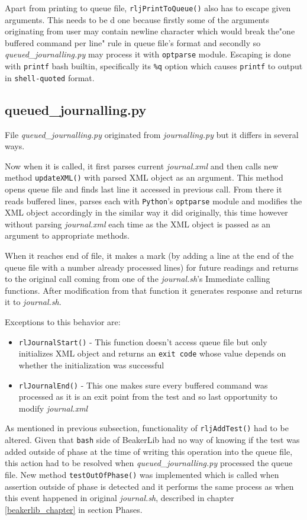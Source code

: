Apart from printing to queue file, \texttt{rljPrintToQueue()} also has to escape given arguments. This needs to be d
one because firstly some of the arguments originating from user may contain newline character which would break the"one buffered command per line" rule in  queue file's format and secondly so \textit{queued\_journalling.py} may process it with \texttt{optparse} module.
Escaping is done with \texttt{printf} bash builtin\cite{bash_builtins}, specifically its \texttt{\%q} option which causes \texttt{printf} to output in \texttt{shell-quoted} format.

\subsection{queued\_journalling.py}
File \textit{queued\_journalling.py} originated from \textit{journalling.py} but it differs in several ways.

Now when it is called, it first parses current \textit{journal.xml} and then calls new method \texttt{updateXML()} with parsed XML object as an argument. This method opens queue file and finds last line it accessed in previous call. From there it reads buffered lines, parses each with \texttt{Python}'s \texttt{optparse} module and modifies the XML object accordingly in the similar way it did originally, this time however without parsing \textit{journal.xml} each time as the XML object is passed as an argument to appropriate methods. 

When it reaches end of file, it makes a mark (by adding a line at the end of the queue file with a number already processed lines) for future readings and returns to the original call coming from one of the \textit{journal.sh}'s  Immediate calling functions. After modification from that function it generates response and returns it to \textit{journal.sh}. 

Exceptions to this behavior are:
\begin{itemize}
\item \texttt{rlJournalStart()} - This function doesn't access queue file but only initializes XML object and returns an \texttt{exit code} whose value depends on whether the initialization was successful 
\item \texttt{rlJournalEnd()} - This one makes sure every buffered command was processed as it is an exit point from the test and so last opportunity to modify \textit{journal.xml}
\end{itemize}

As mentioned in previous subsection, functionality of  \texttt{rljAddTest()} had to be altered. Given that \texttt{bash} side of BeakerLib had no way of knowing if the test was added outside of phase at the time of writing this operation into the queue file, this action had to be resolved when \textit{queued\_journalling.py} processed the queue file. 
New method \texttt{testOutOfPhase()} was implemented which is called when assertion outside of phase is detected and it performs the same process as when this event happened in original \textit{journal.sh}, described in chapter \ref{beakerlib_chapter} in section Phases.

